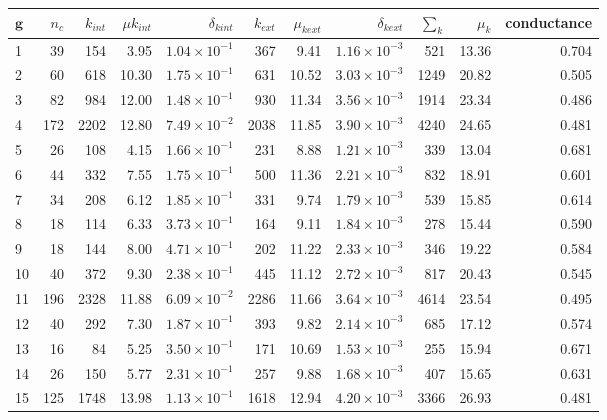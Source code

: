 \begin{table}[ht]
\centering
\begin{adjustbox}{max width=\textwidth}
\setlength{\extrarowheight}{2pt}
\begin{tabular}{lrrrrrrrrrr}
  \toprule
$\mathbf{g}$ & $n_c$ & $k_{int}$ & $\mu k_{int}$ & $\delta_{k int}$ & $k_{ext}$ & $\mu_{k ext}$ & $\delta_{k ext}$ & $\sum_k$ & $\mu_k$ & conductance \\ 
  \midrule
1 & 39 & 154 & 3.95 & $1.04 \times 10^{-1}$ & 367 & 9.41 & $1.16 \times 10^{-3}$ & 521 & 13.36 & 0.704 \\ 
  2 & 60 & 618 & 10.30 & $1.75 \times 10^{-1}$ & 631 & 10.52 & $3.03 \times 10^{-3}$ & 1249 & 20.82 & 0.505 \\ 
  3 & 82 & 984 & 12.00 & $1.48 \times 10^{-1}$ & 930 & 11.34 & $3.56 \times 10^{-3}$ & 1914 & 23.34 & 0.486 \\ 
  4 & 172 & 2202 & 12.80 & $7.49 \times 10^{-2}$ & 2038 & 11.85 & $3.90 \times 10^{-3}$ & 4240 & 24.65 & 0.481 \\ 
  5 & 26 & 108 & 4.15 & $1.66 \times 10^{-1}$ & 231 & 8.88 & $1.21 \times 10^{-3}$ & 339 & 13.04 & 0.681 \\ 
  6 & 44 & 332 & 7.55 & $1.75 \times 10^{-1}$ & 500 & 11.36 & $2.21 \times 10^{-3}$ & 832 & 18.91 & 0.601 \\ 
  7 & 34 & 208 & 6.12 & $1.85 \times 10^{-1}$ & 331 & 9.74 & $1.79 \times 10^{-3}$ & 539 & 15.85 & 0.614 \\ 
  8 & 18 & 114 & 6.33 & $3.73 \times 10^{-1}$ & 164 & 9.11 & $1.84 \times 10^{-3}$ & 278 & 15.44 & 0.590 \\ 
  9 & 18 & 144 & 8.00 & $4.71 \times 10^{-1}$ & 202 & 11.22 & $2.33 \times 10^{-3}$ & 346 & 19.22 & 0.584 \\ 
  10 & 40 & 372 & 9.30 & $2.38 \times 10^{-1}$ & 445 & 11.12 & $2.72 \times 10^{-3}$ & 817 & 20.43 & 0.545 \\ 
  11 & 196 & 2328 & 11.88 & $6.09 \times 10^{-2}$ & 2286 & 11.66 & $3.64 \times 10^{-3}$ & 4614 & 23.54 & 0.495 \\ 
  12 & 40 & 292 & 7.30 & $1.87 \times 10^{-1}$ & 393 & 9.82 & $2.14 \times 10^{-3}$ & 685 & 17.12 & 0.574 \\ 
  13 & 16 & 84 & 5.25 & $3.50 \times 10^{-1}$ & 171 & 10.69 & $1.53 \times 10^{-3}$ & 255 & 15.94 & 0.671 \\ 
  14 & 26 & 150 & 5.77 & $2.31 \times 10^{-1}$ & 257 & 9.88 & $1.68 \times 10^{-3}$ & 407 & 15.65 & 0.631 \\ 
  15 & 125 & 1748 & 13.98 & $1.13 \times 10^{-1}$ & 1618 & 12.94 & $4.20 \times 10^{-3}$ & 3366 & 26.93 & 0.481 \\ 

\end{tabular}
\end{adjustbox}
\end{table}
